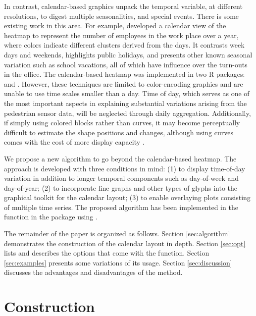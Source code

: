 \documentclass[article]{jss}
\theoremstyle{definition}
\theoremstyle{definition}
\theoremstyle{definition}
\theoremstyle{remark}
\begin{document}
In contrast, calendar-based graphics unpack the temporal variable, at
different resolutions, to digest multiple seasonalities, and special
events. There is some existing work in this area. For example,
\citet{VanWijkCluster1999} developed a calendar view of the heatmap to
represent the number of employees in the work place over a year, where
colors indicate different clusters derived from the days. It contrasts
week days and weekends, highlights public holidays, and presents other
known seasonal variation such as school vacations, all of which have
influence over the turn-outs in the office. The calendar-based heatmap
was implemented in two R packages: 
\citep{R-ggTimeSeries} and  \citep{R-ggcal}. However, these
techniques are limited to color-encoding graphics and are unable to use
time scales smaller than a day. Time of day, which serves as one of the
most important aspects in explaining substantial variations arising from
the pedestrian sensor data, will be neglected through daily aggregation.
Additionally, if simply using colored blocks rather than curves, it may
become perceptually difficult to estimate the shape positions and
changes, although using curves comes with the cost of more display
capacity \citep{cleveland1984graphical, lam2007overview}.

We propose a new algorithm to go beyond the calendar-based heatmap. The
approach is developed with three conditions in mind: (1) to display
time-of-day variation in addition to longer temporal components such as
day-of-week and day-of-year; (2) to incorporate line graphs and other
types of glyphs into the graphical toolkit for the calendar layout; (3)
to enable overlaying plots consisting of multiple time series. The
proposed algorithm has been implemented in the 
function in the  package using 
\citep{R-base}.

The remainder of the paper is organized as follows. Section
\ref{sec:algorithm} demonstrates the construction of the calendar layout
in depth. Section \ref{sec:opt} lists and describes the options that
come with the  function. Section \ref{sec:examples}
presents some variations of its usage. Section \ref{sec:discussion}
discusses the advantages and disadvantages of the method.

\section{Construction}\label{construction}
\end{document}
